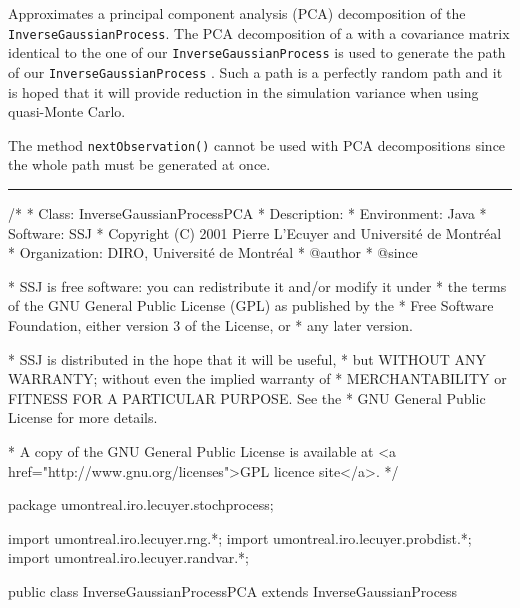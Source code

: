 
Approximates a principal component analysis (PCA)
decomposition of the \texttt{InverseGaussianProcess}.
The PCA decomposition of a 
with a covariance matrix identical to the one
of our \texttt{InverseGaussianProcess} is used to 
generate the path of our \texttt{InverseGaussianProcess}
\cite{fLEC08a}.  Such a path is a perfectly random path
and it is hoped that it will provide reduction
in the simulation variance when using quasi-Monte Carlo.

The method \texttt{nextObservation()} cannot be used with 
PCA decompositions since the whole path must be generated at
once. 


\bigskip\hrule\bigskip

\begin{code}
\begin{hide}
/*
 * Class:        InverseGaussianProcessPCA
 * Description:  
 * Environment:  Java
 * Software:     SSJ 
 * Copyright (C) 2001  Pierre L'Ecuyer and Université de Montréal
 * Organization: DIRO, Université de Montréal
 * @author       
 * @since

 * SSJ is free software: you can redistribute it and/or modify it under
 * the terms of the GNU General Public License (GPL) as published by the
 * Free Software Foundation, either version 3 of the License, or
 * any later version.

 * SSJ is distributed in the hope that it will be useful,
 * but WITHOUT ANY WARRANTY; without even the implied warranty of
 * MERCHANTABILITY or FITNESS FOR A PARTICULAR PURPOSE.  See the
 * GNU General Public License for more details.

 * A copy of the GNU General Public License is available at
   <a href="http://www.gnu.org/licenses">GPL licence site</a>.
 */
\end{hide}
package umontreal.iro.lecuyer.stochprocess;\begin{hide}
import umontreal.iro.lecuyer.rng.*;
import umontreal.iro.lecuyer.probdist.*;
import umontreal.iro.lecuyer.randvar.*;

\end{hide}

public class InverseGaussianProcessPCA extends InverseGaussianProcess \begin{hide} {

    protected BrownianMotionPCA bmPCA;
\end{hide}
\end{code}
